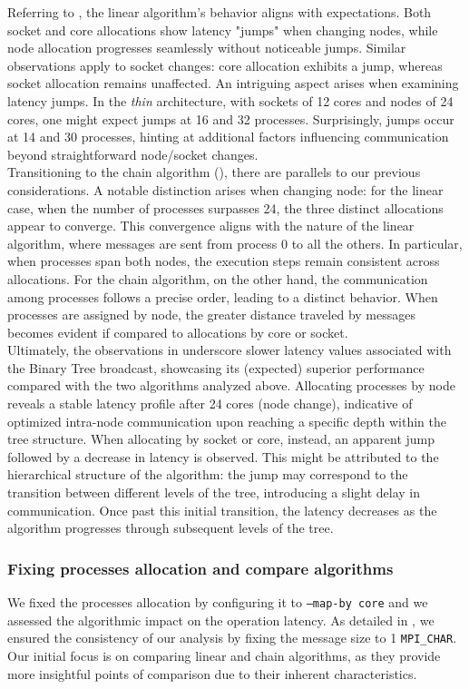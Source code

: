 \documentclass{article}
\begin{document}
Referring to , the linear algorithm's behavior aligns with expectations. Both socket and core allocations show latency "jumps" when changing nodes, while node allocation progresses seamlessly without noticeable jumps. Similar observations apply to socket changes: core allocation exhibits a jump, whereas socket allocation remains unaffected. An intriguing aspect arises when examining latency jumps. In the \textit{thin} architecture, with sockets of 12 cores and nodes of 24 cores, one might expect jumps at 16 and 32 processes. Surprisingly, jumps occur at 14 and 30 processes, hinting at additional factors influencing communication beyond straightforward node/socket changes.\\[0.3cm]
Transitioning to the chain algorithm (), there are parallels to our previous considerations. A notable distinction arises when changing node: for the linear case, when the number of processes surpasses 24, the three distinct allocations appear to converge. This convergence aligns with the nature of the linear algorithm, where messages are sent from process 0 to all the others. In particular, when processes span both nodes, the execution steps remain consistent across allocations. For the chain algorithm, on the other hand, the communication among processes follows a precise order, leading to a distinct behavior. When processes are assigned by node, the greater distance traveled by messages becomes evident if compared to allocations by core or socket.\\[0.3cm]
Ultimately, the observations in  underscore slower latency values associated with the Binary Tree broadcast, showcasing its (expected) superior performance compared with the two algorithms analyzed above. Allocating processes by node reveals a stable latency profile after 24 cores (node change), indicative of optimized intra-node communication upon reaching a specific depth within the tree structure. When allocating by socket or core, instead, an apparent jump followed by a decrease in latency is observed. This might be attributed to the hierarchical structure of the algorithm: the jump may correspond to the transition between different levels of the tree, introducing a slight delay in communication. Once past this initial transition, the latency decreases as the algorithm progresses through subsequent levels of the tree.


\subsubsection{Fixing processes allocation and compare algorithms}\label{subsubsection:alg}
We fixed the processes allocation by configuring it to \texttt{--map-by core} and we assessed the algorithmic impact on the operation latency. As detailed in , we ensured the consistency of our analysis by fixing the message size to 1 \texttt{MPI\_CHAR}. Our initial focus is on comparing linear and chain algorithms, as they provide more insightful points of comparison due to their inherent characteristics.
\end{document}

